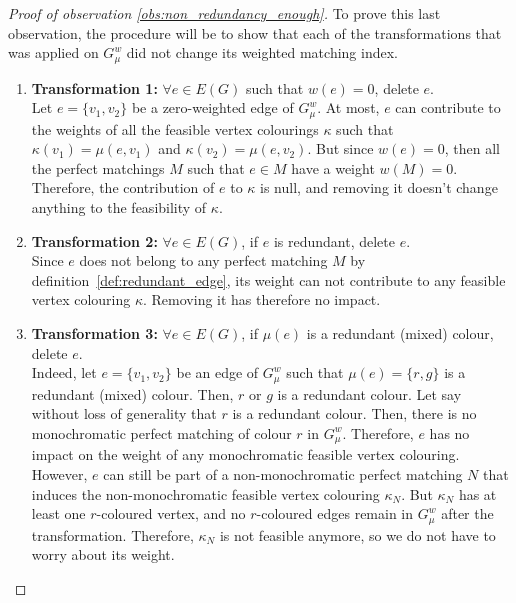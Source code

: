 \begin{proof}[Proof of observation \ref{obs:non_redundancy_enough}]
    To prove this last observation, the procedure will be to show that each of the transformations that was applied on $G_\mu^w$ did not change its weighted matching index.

    \begin{enumerate}
        \item \textbf{Transformation 1:} $\forall e \in E(G)$ such that $w(e) = 0$, delete $e$. \\
            Let $e = \{v_1, v_2\}$ be a zero-weighted edge of $G_\mu^w$.
            At most, $e$ can contribute to the weights of all the feasible vertex colourings $\kappa$ such that $\kappa(v_1) = \mu(e, v_1)$ and $\kappa(v_2) = \mu(e, v_2)$.
            But since $w(e) = 0$, then all the perfect matchings $M$ such that $e \in M$ have a weight $w(M) = 0$.
            Therefore, the contribution of $e$ to $\kappa$ is null, and removing it doesn't change anything to the feasibility of $\kappa$.

        \item \textbf{Transformation 2:} $\forall e \in E(G)$, if $e$ is redundant, delete $e$. \\
            Since $e$ does not belong to any perfect matching $M$ by definition~\ref{def:redundant_edge}, its weight can not contribute to any feasible vertex colouring $\kappa$.
            Removing it has therefore no impact.

        \item \textbf{Transformation 3:} $\forall e \in E(G)$, if $\mu(e)$ is a redundant (mixed) colour, delete $e$. \\
            Indeed, let $e = \{v_1, v_2\}$ be an edge of $G_\mu^w$ such that $\mu(e) = \{r, g\}$ is a redundant (mixed) colour.
            Then, $r$ or $g$ is a redundant colour.
            Let say without loss of generality that $r$ is a redundant colour.
            Then, there is no monochromatic perfect matching of colour $r$ in $G_\mu^w$.
            Therefore, $e$ has no impact on the weight of any monochromatic feasible vertex colouring.\\

            However, $e$ can still be part of a non-monochromatic perfect matching $N$ that induces the non-monochromatic feasible vertex colouring $\kappa_N$.
            But $\kappa_N$ has at least one $r$-coloured vertex, and no $r$-coloured edges remain in $G_\mu^w$ after the transformation.
            Therefore, $\kappa_N$ is not feasible anymore, so we do not have to worry about its weight.


\end{enumerate}
\end{proof}
